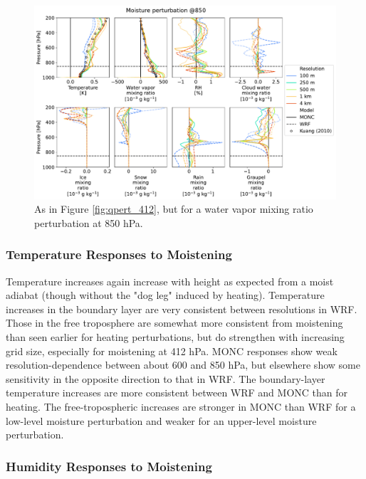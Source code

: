 \documentclass[draft]{agujournal2019}
\begin{document}
\begin{figure}[pth]
    \noindent\includegraphics[width=\textwidth]{figures/pert_diffs_q_0.0002_@850}
    \caption{As in Figure \ref{fig:qpert_412}, but for a water vapor mixing
    ratio perturbation at 850 hPa.}
    \label{fig:qpert_850}
\end{figure}

\subsubsection{Temperature Responses to Moistening}

Temperature increases again increase with height as expected from a moist adiabat (though without the "dog leg" induced by heating).  Temperature increases in the boundary layer are
very consistent between resolutions in WRF. Those in the free troposphere are somewhat more consistent from moistening than seen earlier for heating perturbations, but
do strengthen with increasing grid size, especially for moistening at 412 hPa. MONC responses show weak resolution-dependence between about 600 and 850 hPa, but elsewhere show some sensitivity in the opposite direction to that in WRF. The boundary-layer
temperature increases are more consistent between WRF and MONC than for heating. The
free-tropospheric increases are stronger in MONC than WRF for a low-level moisture
perturbation and weaker for an upper-level moisture perturbation.

\subsubsection{Humidity Responses to Moistening}
\end{document}
